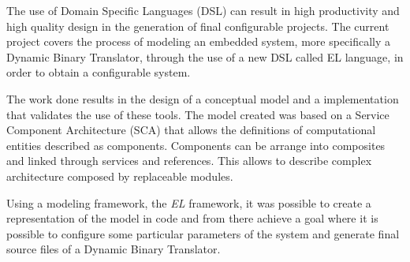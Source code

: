 The use of Domain Specific Languages (DSL) can result in high productivity and high quality design in the generation of final configurable projects. The current project covers the process of modeling an embedded system, more specifically a Dynamic Binary Translator, through the use of a new DSL called EL language, in order to obtain a configurable system. 

The work done results in the design of a conceptual model and a implementation that validates the use of these tools. The model created was based on a Service Component Architecture (SCA) that allows the definitions of computational entities described as components. Components can be arrange into composites and linked through services and references. This allows to describe complex architecture composed by replaceable modules.  

Using a modeling framework, the \textit{EL} framework, it was possible to create a representation of the model in code and from there achieve a goal where it is possible to configure some particular parameters of the system and generate final source files of a Dynamic Binary Translator. 